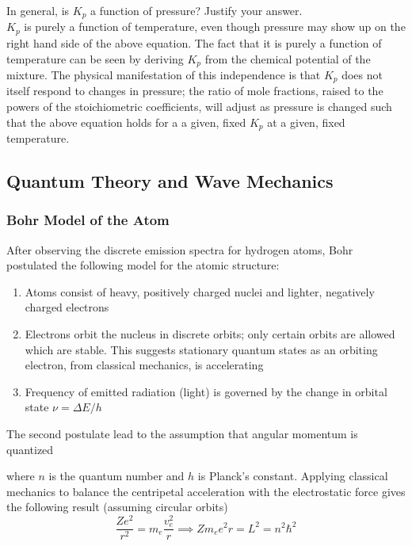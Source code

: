 \documentclass[11pt]{article}
\newcommand{\CenteredBoxed}[1]{\begin{center}\boxed{#1}\end{center}}
\begin{document}
\begin{itemize}
\CenteredBoxed{K_p = \frac{\chi_C^c}{\chi_A^a\chi_B^b}p^{(c-(a+b))}}

In general, is $K_p$ a function of pressure? Justify your answer.\\

$K_p$ is purely a function of temperature, even though pressure may show up on the right hand side of the above equation. The fact that it is purely a function of temperature can be seen by deriving $K_p$ from the chemical potential of the mixture. The physical manifestation of this independence is that $K_p$ does not itself respond to changes in pressure; the ratio of mole fractions, raised to the powers of the stoichiometric coefficients, will adjust as pressure is changed such that the above equation holds for a a given, fixed $K_p$ at a given, fixed temperature.
\end{itemize}

\subsection{Quantum Theory and Wave Mechanics}
\subsubsection{Bohr Model of the Atom}
After observing the discrete emission spectra for hydrogen atoms, Bohr postulated the following model for the atomic structure:
\begin{enumerate}
\item Atoms consist of heavy, positively charged nuclei and lighter, negatively charged electrons
\item Electrons orbit the nucleus in discrete orbits; only certain orbits are allowed which are stable. This suggests stationary quantum states as an orbiting electron, from classical mechanics, is accelerating
\item Frequency of emitted radiation (light) is governed by the change in orbital state $\nu=\Delta E/h$
\end{enumerate}

The second postulate lead to the assumption that angular momentum is quantized
\CenteredBoxed{L = m_ev_er = m_e\omega r = n\frac{h}{2\pi} = n\hbar}
where $n$ is the quantum number and $h$ is Planck's constant. Applying classical mechanics to balance the centripetal acceleration with the electrostatic force gives the following result (assuming circular orbits)
$$\frac{Ze^2}{r^2} = m_e\frac{v_e^2}{r}\implies Zm_ee^2r = L^2 = n^2\hbar^2$$
\end{document}
